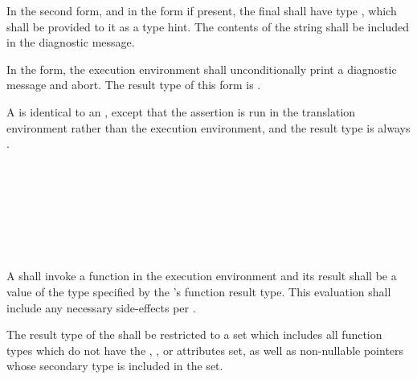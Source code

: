 \specsubsubitem
In the second  form, and in the  form if
present, the final  shall have type ,
which shall be provided to it as a type hint. The contents of the string shall
be included in the diagnostic message.

\specsubsubitem
In the  form, the execution environment shall unconditionally
print a diagnostic message and abort. The result type of this form is
.

\specsubsubitem
A  is identical to an
, except that the assertion is run in the
translation environment rather than the execution environment, and the result
type is always .


\begin{grammar}
 \\
	 \terminal{(}  \terminal{)} \\

 \\
	 \optional{\terminal{,}} \\
	  \\
	 \terminal{,}  \\
\end{grammar}

\specsubsubitem
A  shall invoke a function in the execution
environment and its result shall be a value of the type specified by the
's function result type. This evaluation shall
include any necessary side-effects per .

\specsubsubitem
The result type of the  shall be restricted to a
set which includes all function types which do not have the ,
, or  attributes set, as well as non-nullable
pointers whose secondary type is included in the set.


